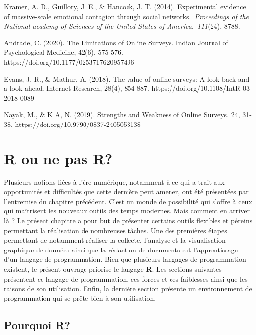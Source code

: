 \documentclass[
  letterpaper,
]{scrbook}
\begin{document}
Kramer, A. D., Guillory, J. E., \& Hancock, J. T. (2014). Experimental
evidence of massive-scale emotional contagion through social
networks.~\emph{Proceedings of the National academy of Sciences of the
United States of America},~\emph{111}(24), 8788.

Andrade, C. (2020). The Limitations of Online Surveys. Indian Journal of
Psychological Medicine, 42(6), 575-576.
https://doi.org/10.1177/0253717620957496

\hfill\break
Evans, J. R., \& Mathur, A. (2018). The value of online surveys: A look
back and a look ahead. Internet Research, 28(4), 854-887.
https://doi.org/10.1108/IntR-03-2018-0089

\hfill\break
Nayak, M., \& K A, N. (2019). Strengths and Weakness of Online Surveys.
24, 31-38. https://doi.org/10.9790/0837-2405053138


\hypertarget{sec-chap4}{%
\chapter{R ou ne pas R?}\label{sec-chap4}}

Plusieurs notions liées à l'ère numérique, notamment à ce qui a trait
aux opportunités et difficultés que cette dernière peut amener, ont été
présentées par l'entremise du chapitre précédent. C'est un monde de
possibilité qui s'offre à ceux qui maîtrisent les nouveaux outils des
temps modernes. Mais comment en arriver là ? Le présent chapitre a pour
but de présenter certains outils flexibles et péreins permettant la
réalisation de nombreuses tâches. Une des premières étapes permettant de
notamment réaliser la collecte, l'analyse et la visualisation graphique
de données ainsi que la rédaction de documents est l'apprentissage d'un
langage de programmation. Bien que plusieurs langages de programmation
existent, le présent ouvrage priorise le langage \textbf{R}. Les
sections suivantes présentent ce langage de programmation, ces forces et
ces faiblesses ainsi que les raisons de son utilisation. Enfin, la
dernière section présente un environnement de programmation qui se prête
bien à son utilisation.

\hypertarget{pourquoi-r}{%
\section{Pourquoi R?}\label{pourquoi-r}}
\end{document}
